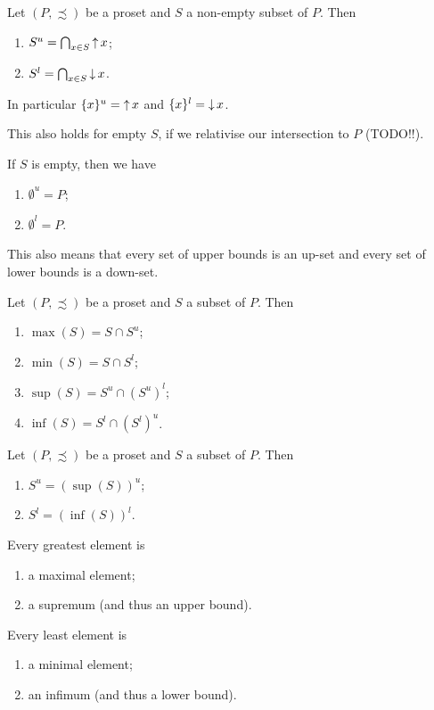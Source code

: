 \begin{lemma} \label{lemma:boundsFromUpDownSets}
Let $(P,\precsim)$ be a proset and $S$ a non-empty subset of $P$. Then
\begin{enumerate}
\item $S^u = \bigcap_{x\in S}\mathop{\uparrow} x$;
\item $S^l = \bigcap_{x\in S}\mathop{\downarrow} x$.
\end{enumerate}
In particular $\{x\}^u = \mathop{\uparrow} x$ and $\{x\}^l = \mathop{\downarrow} x$.

This also holds for empty $S$, if we relativise our intersection to $P$ (TODO!!).

If $S$ is empty, then we have
\begin{enumerate}
\item $\emptyset^u = P$;
\item $\emptyset^l = P$.
\end{enumerate}
\end{lemma}
This also means that every set of upper bounds is an up-set and every set of lower bounds is a down-set.

\begin{lemma}
Let $(P,\precsim)$ be a proset and $S$ a subset of $P$. Then
\begin{enumerate}
\item $\max(S) = S\cap S^u$;
\item $\min(S) = S\cap S^l$;
\item $\sup(S) = S^u\cap (S^u)^l$;
\item $\inf(S) = S^l\cap (S^l)^u$.
\end{enumerate}
\end{lemma}

\begin{lemma}
Let $(P,\precsim)$ be a proset and $S$ a subset of $P$. Then
\begin{enumerate}
\item $S^u = (\sup(S))^u$;
\item $S^l = (\inf(S))^l$.
\end{enumerate}
\end{lemma}

\begin{lemma}
Every greatest element is
\begin{enumerate}
\item a maximal element;
\item a supremum (and thus an upper bound).
\end{enumerate}
Every least element is
\begin{enumerate}
\item a minimal element;
\item an infimum (and thus a lower bound).
\end{enumerate}
\end{lemma}

